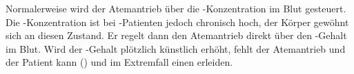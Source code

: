 \documentclass[
ngerman,
paper=a4,
asymmetric,
fontsize=10pt,
draft=false,
numbers=noenddot,
bibtotocnumbered,
footnotes=multiple,
]{scrreprt}
\begin{document}
{
Normalerweise wird der Atemantrieb über die
-Konzentration im Blut gesteuert. Die
-Konzentration ist bei -Patienten jedoch chronisch
hoch, der Körper gewöhnt sich an diesen Zustand. Er
regelt dann den Atemantrieb direkt über den -Gehalt im Blut.
Wird der -Gehalt plötzlich künstlich erhöht, fehlt
der Atemantrieb und der Patient kann
 () und
im Extremfall einen  erleiden.

}{

\SymbolText
}{}{}{}
 
 
 
%  
\end{document}
